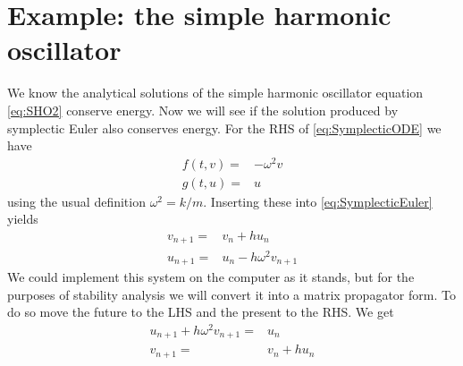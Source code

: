\documentclass[hidelinks,notitlepage]{book}
\begin{document}
\section{Example: the simple harmonic oscillator}
We know the analytical solutions of the simple harmonic oscillator equation \cref{eq:SHO2} conserve energy.  Now we will see if the solution produced by symplectic Euler also conserves energy.  For the RHS of \cref{eq:SymplecticODE} we have
\begin{align}
\nonumber
f(t, v)  =& -\omega^2 v \\
\nonumber
g(t, u)  =& u
\end{align}
using the usual definition $\omega^2 = k/m$.  Inserting these into \cref{eq:SymplecticEuler} yields
\begin{equation}
\begin{aligned}
v_{n+1} =& v_n + h u_n \\
u_{n+1} =& u_n - h \omega^2 v_{n+1}
\end{aligned}
\label{eq:SymplecticEulerSHO}
\end{equation}
We could implement this system on the computer as it stands, but for the purposes of stability analysis we will convert it into a matrix propagator form.  To do so move the future to the LHS and the present to the RHS.  We get
\begin{equation}
\nonumber
\begin{aligned}
u_{n+1} + h \omega^2 v_{n+1}  =& u_n \\
v_{n+1} =& v_n + h u_n 
\end{aligned}
\end{equation}
\end{document}
